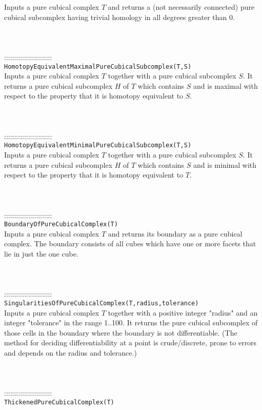 \documentclass[a4paper,11pt]{report}
\begin{document}
{ Inputs a pure cubical complex $T$ and returns a (not necessarily connected) pure cubical subcomplex having
trivial homology in all degrees greater than $0$. \\
 \\
 \\
 \\
 ::::::::::::::::::::::::\\
 \texttt{HomotopyEquivalentMaximalPureCubicalSubcomplex(T,S)}\\
 

 Inputs a pure cubical complex $T$ together with a pure cubical subcomplex $S$. It returns a pure cubical subcomplex $H$ of $T$ which contains $S$ and is maximal with respect to the property that it is homotopy equivalent to $S$. \\
 \\
 \\
 \\
 ::::::::::::::::::::::::\\
 \texttt{HomotopyEquivalentMinimalPureCubicalSubcomplex(T,S)}\\
 

 Inputs a pure cubical complex $T$ together with a pure cubical subcomplex $S$. It returns a pure cubical subcomplex $H$ of $T$ which contains $S$ and is minimal with respect to the property that it is homotopy equivalent to $T$. \\
 \\
 \\
 \\
 ::::::::::::::::::::::::\\
 \texttt{BoundaryOfPureCubicalComplex(T)}\\
 

 Inputs a pure cubical complex $T$ and returns its boundary as a pure cubical complex. The boundary consists of
all cubes which have one or more facets that lie in just the one cube. \\
 \\
 \\
 \\
 ::::::::::::::::::::::::\\
 \texttt{SingularitiesOfPureCubicalComplex(T,radius,tolerance)}\\
 

 Inputs a pure cubical complex $T$ together with a positive integer "radius" and an integer "tolerance" in the
range 1..100. It returns the pure cubical subcomplex of those cells in the
boundary where the boundary is not differentiable. (The method for deciding
differentiability at a point is crude/discrete, prone to errors and depends on
the radius and tolerance.) \\
 \\
 \\
 \\
 ::::::::::::::::::::::::\\
 \texttt{ThickenedPureCubicalComplex(T)}\\
 

}
\end{document}
